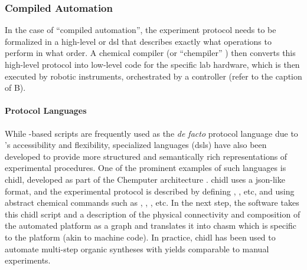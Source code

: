 \subsubsection{Compiled Automation}
In the case of \enquote{compiled automation}, the experiment protocol needs to be formalized in a high-level or \gls{dsl} that describes exactly what operations to perform in what order. 
A chemical compiler (or \enquote{chempiler} \autocite{steiner2019organic}) then converts this high-level protocol into low-level code for the specific lab hardware, which is then executed by robotic instruments, orchestrated by a controller (refer to the caption of B). 

\paragraph{Protocol Languages} While -based scripts are frequently used as the \textit{de facto} protocol language due to 's accessibility and flexibility,\autocite{pylabrobot,vriza2023polybot, wang2025polybot} specialized languages (\glspl{dsl}) have also been developed to provide more structured and semantically rich representations of experimental procedures.\autocite{wang2022ulsa, ananthanarayanan2010biocoder, autoprotocol2023, Park2023CMDL} 
One of the prominent examples of such languages is \gls{chidl}\autocite{xdl2023spec}, developed as part of the Chemputer architecture \autocite{steiner2019organic, mehr2020universal, hammer2021chemputation}. 
\gls{chidl} uses a \gls{json}-like format, and the experimental protocol is described by defining , , etc, and using abstract chemical commands such as , , , etc. 
In the next step, the  software takes this \gls{chidl} script and a description of the physical connectivity and composition of the automated platform as a graph and translates it into \gls{chasm} which is specific to the platform (akin to machine code). 
In practice, \gls{chidl}  has been used to automate multi-step organic syntheses with yields comparable to manual experiments.\autocite{mehr2020universal} 

